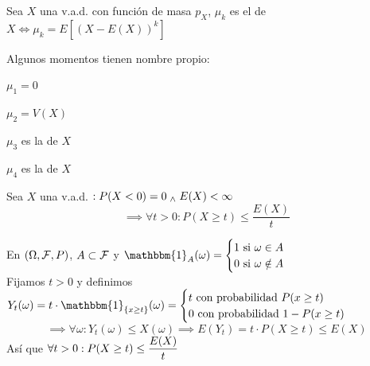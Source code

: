 \begin{defn}[Momentos de $X$]
	Sea $X$ una v.a.d. con función de masa $p_X$, $\mu_k$ es el  de $X \iff \mu_k= E\left[(X-E(X))^k\right]$
\end{defn}

\begin{obs} Algunos momentos tienen nombre propio: \\
	\begin{enumerate*}[itemjoin=\hspace{1cm}]
		\item $\mu_1=0$
		\item $\mu_2=V(X)$
		\item $\mu_3$ es la  de $X$
		\item $\mu_4$ es la  de $X$
	\end{enumerate*}
\end{obs}

\begin{teo}
	Sea $X$ una v.a.d. $: P(X<0)=0 \; _{\wedge} \; E(X)<\infty$
	\[\implies \forall t >0 : P(X\geq t) \leq \frac{E(X)}{t}\]
	\begin{dem}
		 En $(\Omega, \mathcal{F}, P)$, $A\subset \mathcal{F}$ y $\ds \mathbbm{1}_A(\omega) = \begin{cases}
				1 \tex{ si } \omega \in A \\
				0 \tex{ si } \omega \notin A
			\end{cases}$ \\
		Fijamos $t>0$ y definimos $Y_t(\omega)=t\cdot \mathbbm{1}_{\{x\geq t\}}(\omega)=\begin{cases}
				t \tex{ con probabilidad } P(x\geq t) \\
				0 \tex{ con probabilidad } 1-P(x\geq t)
			\end{cases}$
		\[\implies \forall \omega : Y_t(\omega)\leq X(\omega) \implies E(Y_t)=t\cdot P(X\geq t)\leq E(X)\]
		Así que $\displaystyle \forall t >0 : P(X\geq t) \leq \frac{E(X)}{t}$
	\end{dem}
\end{teo}

